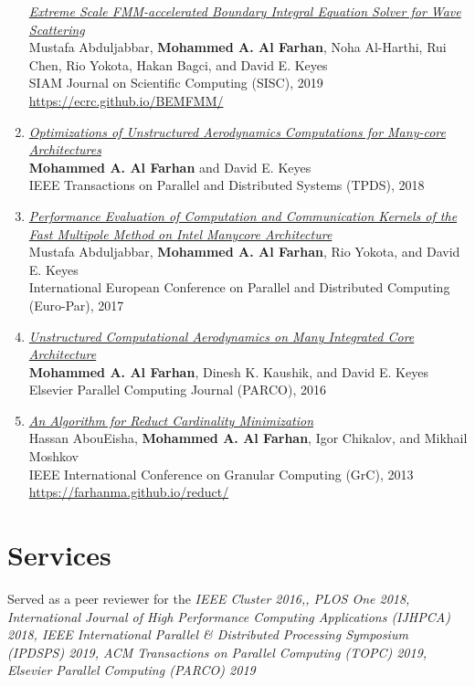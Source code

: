 \documentclass[margin]{resume2}
\begin{document}
\begin{resume}
\begin{enumerate}[leftmargin=*]
      \href{https://epubs.siam.org/doi/10.1137/18M1173599}
      {{\it Extreme Scale FMM-accelerated Boundary Integral Equation Solver for Wave Scattering}}\\
      Mustafa Abduljabbar, {\bf Mohammed A. Al Farhan}, Noha Al-Harthi, Rui Chen,
      Rio Yokota, Hakan Bagci, and David E. Keyes\\
      SIAM Journal on Scientific Computing (SISC), 2019\\
     \url{https://ecrc.github.io/BEMFMM/}
        \item
      {\it \href{https://ieeexplore.ieee.org/document/8337750}
      {Optimizations of Unstructured Aerodynamics Computations for Many-core Architectures}}\\
      {\bf Mohammed A. Al Farhan} and David E. Keyes\\
      IEEE Transactions on Parallel and Distributed Systems (TPDS), 2018
        \item
      {\it \href{https://link.springer.com/chapter/10.1007/978-3-319-64203-1_40}
      {Performance Evaluation of Computation and Communication Kernels of the Fast Multipole Method on Intel Manycore Architecture}}\\
      Mustafa Abduljabbar, {\bf Mohammed A. Al Farhan}, Rio Yokota, and David E. Keyes\\
      International European Conference on Parallel and Distributed Computing (Euro-Par), 2017
        \item
      {\it \href{https://www.sciencedirect.com/science/article/pii/S0167819116300564}
      {Unstructured Computational Aerodynamics on Many Integrated Core Architecture}}\\
      {\bf Mohammed A. Al Farhan}, Dinesh K. Kaushik, and David E. Keyes\\
      Elsevier Parallel Computing Journal (PARCO), 2016
        \item
      {\it \href{https://ieeexplore.ieee.org/document/6740370}
      {An Algorithm for Reduct Cardinality Minimization}}\\
      Hassan AbouEisha, {\bf Mohammed A. Al Farhan}, Igor Chikalov, and Mikhail Moshkov\\
      IEEE International Conference on Granular Computing (GrC), 2013\\
      \url{https://farhanma.github.io/reduct/}
    \end{enumerate}

    \section{Services} Served as a peer reviewer for the {\it IEEE Cluster 2016,, PLOS One 2018, International Journal of High Performance Computing Applications (IJHPCA) 2018, IEEE International Parallel \& Distributed Processing Symposium (IPDSPS) 2019, ACM Transactions on Parallel Computing (TOPC) 2019, Elsevier Parallel Computing (PARCO) 2019}


\end{resume}
\end{document}
